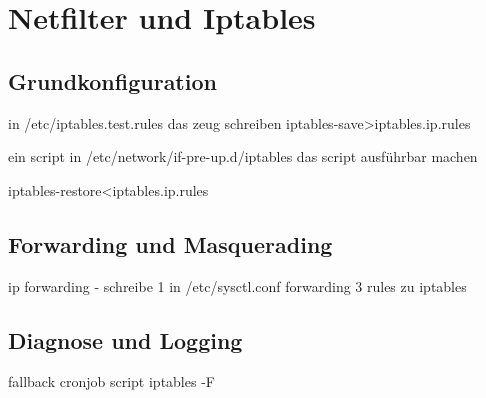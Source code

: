 \chapter{Netfilter und Iptables}
\section{Grundkonfiguration}
in /etc/iptables.test.rules das zeug schreiben
%
iptables-save>iptables.ip.rules

ein script in /etc/network/if-pre-up.d/iptables
das script ausführbar machen

iptables-restore<iptables.ip.rules


\section{Forwarding und Masquerading}
ip  forwarding - schreibe 1 in /etc/sysctl.conf forwarding
3 rules zu iptables

\section{Diagnose und Logging}
fallback cronjob script iptables -F

